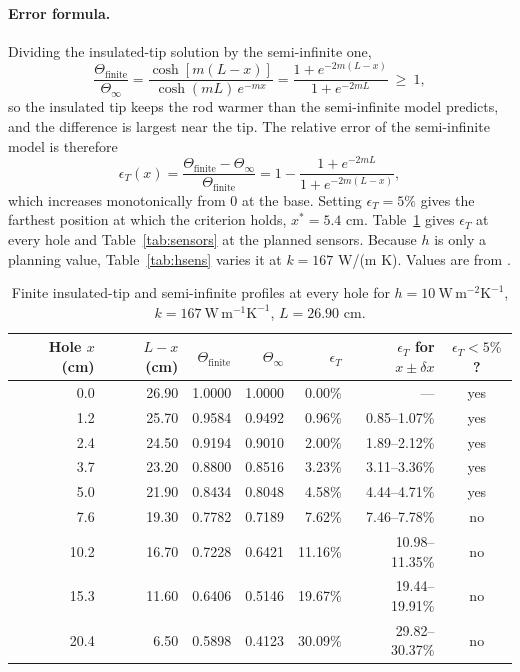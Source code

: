 \documentclass[reprint, amsmath, amssymb, aps, prl]{revtex4-2}
\newcommand{\WmK}{\mathrm{W\,m^{-1}K^{-1}}}
\newcommand{\WmmK}{\mathrm{W\,m^{-2}K^{-1}}}
\begin{document}
\paragraph*{Error formula.}
Dividing the insulated-tip solution by the semi-infinite one,
\begin{equation*}
\frac{\Theta_{\mathrm{finite}}}{\Theta_\infty}
=\frac{\cosh[m(L-x)]}{\cosh(mL)\,e^{-mx}}
=\frac{1+e^{-2m(L-x)}}{1+e^{-2mL}}\ \ge\ 1,
\end{equation*}
so the insulated tip keeps the rod warmer than the semi-infinite model predicts, and the
difference is largest near the tip. The relative error of the semi-infinite model is
therefore
\begin{equation*}
\epsilon_T(x)
=\frac{\Theta_{\mathrm{finite}}-\Theta_\infty}{\Theta_{\mathrm{finite}}}
=1-\frac{1+e^{-2mL}}{1+e^{-2m(L-x)}},
\end{equation*}
which increases monotonically from 0 at the base. Setting $\epsilon_T=5\%$ gives the
farthest position at which the criterion holds, $x^{\ast}=5.4$ cm. Table~\ref{tab:holes}
gives $\epsilon_T$ at every hole and Table~\ref{tab:sensors} at the planned sensors.
Because $h$ is only a planning value, Table~\ref{tab:hsens} varies it at $k=167$ W/(m K).
Values are from .

\begin{table}[t]
\caption{\label{tab:holes}Finite insulated-tip and semi-infinite profiles at every hole
for $h=10~\WmmK$, $k=167~\WmK$, $L=26.90$ cm.}
\begin{ruledtabular}
\begin{tabular}{rrrrrrc}
Hole $x$ (cm) & $L-x$ (cm) & $\Theta_{\mathrm{finite}}$ & $\Theta_\infty$ & $\epsilon_T$ & $\epsilon_T$ for $x\pm\delta x$ & $\epsilon_T<5\%$? \\
\hline
0.0 & 26.90 & 1.0000 & 1.0000 & 0.00\% & --- & yes \\
1.2 & 25.70 & 0.9584 & 0.9492 & 0.96\% & 0.85--1.07\% & yes \\
2.4 & 24.50 & 0.9194 & 0.9010 & 2.00\% & 1.89--2.12\% & yes \\
3.7 & 23.20 & 0.8800 & 0.8516 & 3.23\% & 3.11--3.36\% & yes \\
5.0 & 21.90 & 0.8434 & 0.8048 & 4.58\% & 4.44--4.71\% & yes \\
7.6 & 19.30 & 0.7782 & 0.7189 & 7.62\% & 7.46--7.78\% & no \\
10.2 & 16.70 & 0.7228 & 0.6421 & 11.16\% & 10.98--11.35\% & no \\
15.3 & 11.60 & 0.6406 & 0.5146 & 19.67\% & 19.44--19.91\% & no \\
20.4 & 6.50 & 0.5898 & 0.4123 & 30.09\% & 29.82--30.37\% & no \\
\end{tabular}
\end{ruledtabular}
\end{table}
\end{document}
